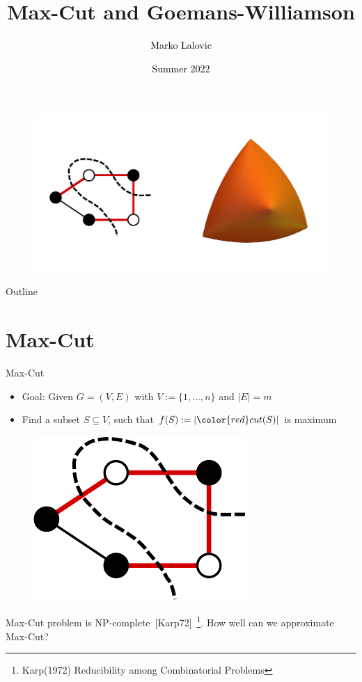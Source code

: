\documentclass[10pt, xcolor={dvipsnames}]{beamer}
\title[Max-Cut and Goemans-Williamson]{Max-Cut and Goemans-Williamson}
\author[\textcolor{white}{Marko Lalovic}]{\textcolor{black}{Marko Lalovic} \vspace{-.2cm}}
\date[\textcolor{white}{Aug 2, 2022}]{\textcolor{black}{Summer 2022}}
\begin{document}
\begin{frame}
\begin{center}
\maketitle
\begin{figure}
    \includegraphics[width=.8\linewidth]{../figures/front-figure.pdf}
\end{figure}
\end{center}
\end{frame}

\begin{frame}{Outline}
    \tableofcontents
\end{frame}

\section{Max-Cut}
\begin{frame}{Max-Cut}
\begin{itemize}
\item Goal: Given $G = (V, E)$ with $V := \lbrace 1, \dots, n \rbrace$ and $|E| = m$
\item Find a subset $S \subseteq V$, such that $f(S) := |{\color{red}cut(S)}|$ is maximum
\end{itemize}

\begin{center}
\begin{figure}
\includegraphics[width=.3\textwidth]{../figures/max-cut-crop.pdf}
\end{figure}
\end{center}
Max-Cut problem is NP-complete~[Karp72]~\footnote{Karp(1972) Reducibility among Combinatorial Problems}. 
How well can we approximate Max-Cut?
\end{frame}
\end{document}
